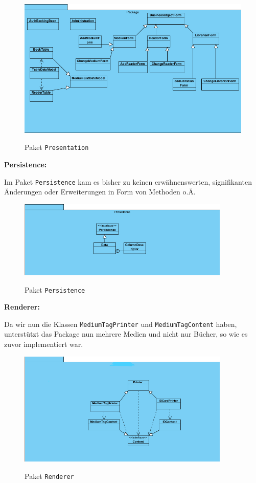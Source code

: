 \documentclass[fontsize=12pt,paper=a4,twoside]{scrartcl}
\begin{document}
\begin{figure} [H] 
\caption{Paket \texttt{Presentation}} \centering
 \includegraphics[width=1\textwidth]{Diagramme/Presentation.png} 
 \label{Presentation} 
\end{figure}

\textbf{Persistence:}

Im Paket \texttt{Persistence} kam es bisher zu keinen erwähnenswerten, signifikanten Änderungen oder Erweiterungen in Form von Methoden o.Ä.

\begin{figure} [H] 
\caption{Paket \texttt{Persistence}} \centering
 \includegraphics[width=0.9\textwidth]{Diagramme/Persistence.png} 
 \label{Persistence} 
\end{figure}
\newpage

\textbf{Renderer:}

Da wir nun die Klassen \texttt{MediumTagPrinter} und \texttt{MediumTagContent} haben, unterstützt das Package nun mehrere Medien und nicht nur Bücher, so wie es zuvor implementiert war.
\begin{figure} [H] 
\caption{Paket \texttt{Renderer}} \centering
 \includegraphics[width=0.9\textwidth]{Diagramme/Renderer.png} 
 \label{Renderer} 
\end{figure}
\end{document}
